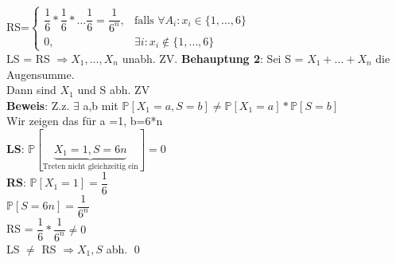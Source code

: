 RS=$\begin{cases}
\dfrac{1}{6}*\dfrac{1}{6}*\dots\dfrac{1}{6} = \dfrac{1}{6^n},&\text{falls } \forall A_i : x_i \in \{1,\dots,6\}\\
0, & \exists i:x_i \notin \{1,\dots,6\}
\end{cases}$\\
LS = RS $\Rightarrow X_1,\dots,X_n$ unabh. ZV.\newpage
\textbf{Behauptung 2}: Sei S = $X_1 + \dots + X_n$ die Augensumme.\\
Dann sind $X_1$ und S abh. ZV\medskip\\
\textbf{Beweis}: Z.z. $\exists$ a,b mit $\mathds{P}[X_1=a,S=b] \neq \mathds{P}[X_1=a]*\mathds{P}[S=b]$\\
Wir zeigen das für a =1, b=6*n\medskip\\
\textbf{LS}: $\mathds{P}[\underbrace{X_1=1,S=6n}_\text{Treten nicht gleichzeitig ein}] = 0$\smallskip\\
\textbf{RS}: $\mathds{P}[X_1 = 1] = \dfrac{1}{6}$\\$\mathds{P}[S=6n]=\dfrac{1}{6^n}$\medskip\\
RS = $\dfrac{1}{6}*\dfrac{1}{6^n} \neq 0$\\
LS $\neq$ RS $\Rightarrow$$X_1,S$ abh. \qed
 